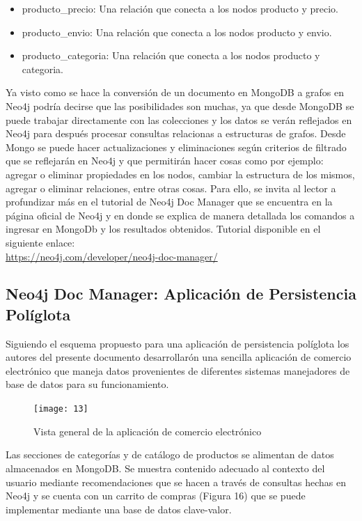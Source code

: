 \documentclass[conference]{IEEEtran}
\begin{document}
\begin{itemize}
\item producto\_precio: Una relaci\'on que conecta a los nodos producto y precio.
\item producto\_envio: Una relaci\'on que conecta a los nodos producto y envio.
\item producto\_categoria: Una relaci\'on que conecta a los nodos producto y categoria.\\
\end{itemize}

Ya visto como se hace la conversi\'on de un documento en MongoDB a grafos en Neo4j podr\'ia decirse que las posibilidades son muchas, ya que desde MongoDB se puede trabajar directamente con las colecciones y los datos se ver\'an reflejados en Neo4j para despu\'es procesar consultas relacionas a estructuras de grafos. Desde Mongo se puede hacer actualizaciones y eliminaciones  seg\'un criterios de filtrado que se reflejar\'an en Neo4j y que permitir\'an hacer cosas como por ejemplo: agregar o eliminar propiedades en los nodos, cambiar la estructura de los mismos, agregar o eliminar relaciones, entre otras cosas. Para ello, se invita al lector a profundizar m\'as en el tutorial de Neo4j Doc Manager que se encuentra en la p\'agina oficial de Neo4j  y en donde se explica de manera detallada los comandos a ingresar en MongoDb y los resultados obtenidos. Tutorial disponible en el siguiente enlace:\\
\url{https://neo4j.com/developer/neo4j-doc-manager/}

\subsection*{Neo4j Doc Manager: Aplicaci\'on de Persistencia Pol\'iglota}

Siguiendo el esquema propuesto para una aplicaci\'on de persistencia pol\'iglota  los autores del presente documento desarrollar\'on una sencilla aplicaci\'on de comercio electr\'onico que maneja datos provenientes de diferentes sistemas manejadores de base de datos para su funcionamiento.

\begin{figure}[!h]
\centering
\texttt{[image: 13]}
\caption{Vista general de la aplicaci\'on de comercio electr\'onico}
\label{}
\end{figure}

Las secciones de categor\'ias y de cat\'alogo de productos se alimentan de datos almacenados en MongoDB. Se muestra contenido adecuado al contexto del usuario mediante recomendaciones que se hacen a trav\'es de consultas hechas en Neo4j y se cuenta con un carrito de compras (Figura 16) que se puede implementar mediante una base de datos clave-valor.
\end{document}
